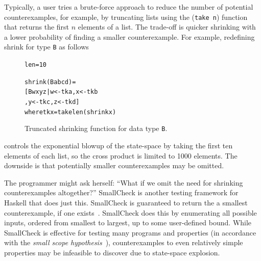 \documentclass[10pt]{sigplanconf}
\newenvironment{code}{\begin{alltt}}{\end{alltt}}
\newcommand{\ttp}[1]{\texttt{#1}}
\begin{document}
Typically, a user tries a brute-force approach to reduce the number of potential
counterexamples, for example, by truncating lists using the (\ttp{take n}) function
that returns the first $n$ elements of a list.  The trade-off is quicker
shrinking with a lower probability of finding a smaller counterexample.  For
example, redefining shrink for type \ttp{B} as follows
%


\begin{figure}[ht]
\begin{code}
len = 10

shrink (B a b c d) =
  [ B w x y z | w <- tk a, x <- tk b
              , y <- tk c, z <- tk d ]
  where tk x = take len (shrink x)
\end{code}
  \caption{Truncated shrinking function for data type \ttp{B}.}
  \label{lst:newshrink}
\end{figure}

%
\noindent
controls the exponential blowup of the state-space by taking the first ten
elements of each list, so the cross product is limited to 1000 elements.  The
downside is that potentially smaller counterexamples may be omitted.

The programmer might ask herself: ``What if we omit the need for shrinking
counterexamples altogether?''  SmallCheck is another testing framework for
Haskell that does just this.  SmallCheck is guaranteed to return the a smallest
counterexample, if one exists~\cite{sc}.  SmallCheck does this by enumerating
all possible inputs, ordered from smallest to largest, up to some user-defined
bound.  While SmallCheck is effective for testing many programs and properties
(in accordance with the \emph{small scope hypothesis}~\cite{jackson}),
counterexamples to even relatively simple properties may be infeasible to
discover due to state-space explosion.
\end{document}
